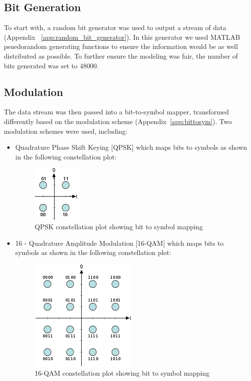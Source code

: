 \documentclass[]{article}
\begin{document}
\subsection{Bit Generation}
\label{sec:bits}
 To start with, a random bit generator was used to output a stream of data (Appendix ~\ref{app:random_bit_generator}). In this generator we used MATLAB psuedorandom generating functions to ensure the information would be as well distributed as possible. To further ensure the modeling was fair, the number of bits generated was set to 48000. 
\subsection{Modulation}
\label{sec:modulation}
The data stream was then passed into a bit-to-symbol mapper, transformed differently based on the modulation scheme  (Appendix~\ref{app:bittosym}).  Two  modulation schemes were used, including:
\begin{itemize}
\item Quadrature Phase Shift Keying [QPSK] which maps bits to symbols  as shown in the following constellation plot:

	\begin{figure}[H]
	\centering
	\includegraphics[width=.2\textwidth]{QPSK.jpg}
	\caption{QPSK constellation plot showing bit to 		symbol mapping}
	\end{figure}

\item 16 - Quadrature Amplitude Modulation [16-QAM] which maps bits to symbols as shown in the following constellation plot:

	\begin{figure}[H]
	\centering
	\includegraphics[width=.3\textwidth]	{16QAM.jpg}
	\caption{16-QAM constellation plot showing bit to 	symbol mapping}
	\end{figure}

\end{itemize}
\end{document}
